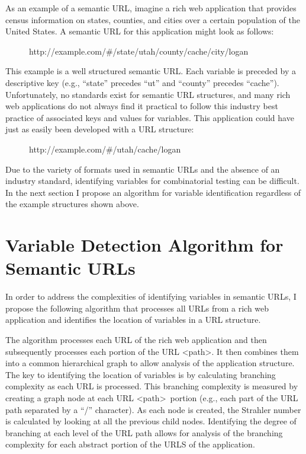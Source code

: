 As an example of a semantic URL, imagine a rich web application that provides census information on states, counties, and cities over a certain population of the United States.  A semantic URL for this application might look as follows:
\begin{figure}[h]
\centering
  http://example.com/\#/state/utah/county/cache/city/logan
\end{figure}

This example is a well structured semantic URL.  Each variable is preceded by a descriptive key (e.g., ``state'' precedes ``ut'' and ``county'' precedes ``cache'').  Unfortunately, no standards exist for semantic URL structures, and many rich web applications do not always find it practical to follow this industry best practice of associated keys and values for variables.  This application could have just as easily been developed with a URL structure:

\begin{figure}[h]
\centering
  http://example.com/\#/utah/cache/logan
\end{figure}

Due to the variety of formats used in semantic URLs and the absence of an industry standard, identifying variables for combinatorial testing can be difficult.  In the next section I propose an algorithm for variable identification regardless of the example structures shown above.

\section{Variable Detection Algorithm for Semantic URLs}
In order to address the complexities of identifying variables in semantic URLs, I propose the following algorithm that processes all URLs from a rich web application and identifies the location of variables in a URL structure.

The algorithm processes each URL of the rich web application and then subsequently processes each portion of the URL \textless path\textgreater.  It then combines them into a common hierarchical graph to allow analysis of the application structure.  The key to identifying the location of variables is by calculating branching complexity as each URL is processed.  This branching complexity is measured by creating a graph node at each URL \textless path\textgreater\ portion (e.g., each part of the URL path separated by a ``/'' character).  As each node is created, the Strahler number is calculated by looking at all the previous child nodes\cite{gleyzer2004fast}.  Identifying the degree of branching at each level of the URL path allows for analysis of the branching complexity for each abstract portion of the URLS of the application.

